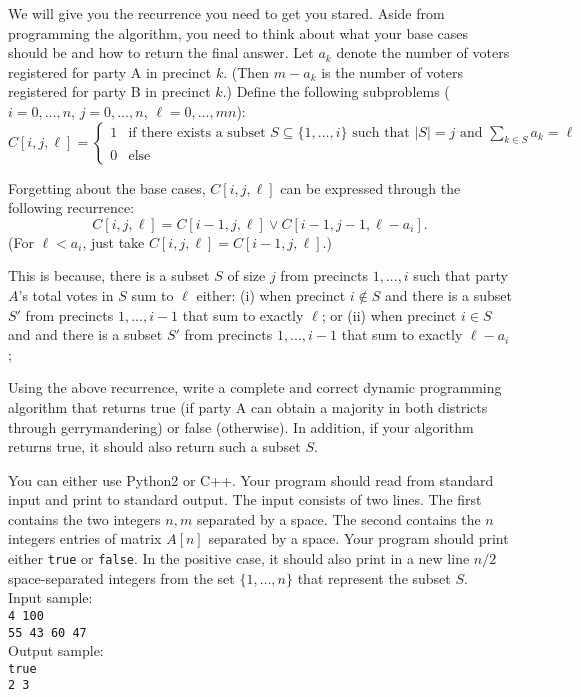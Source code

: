 \documentclass[11pt]{article}
\begin{document}
\begin{enumerate}
We will give you the recurrence you need to get you stared. Aside from programming the algorithm, you need to think about what your base cases should be and how to return the final answer. Let $a_k$ denote the number of voters registered for party A in precinct $k$.  (Then $m-a_k$ is the number of voters registered for party B in precinct $k$.)
Define the following subproblems ($i=0,\ldots,n$, $j=0,\ldots,n$, $\ell=0,\ldots,mn$):
\[ C[i,j,\ell] = \left\{\begin{array}{ll}
1 & \mbox{if there exists a subset $S\subseteq\{1,\dots,i\}$ such that $|S|=j$ and $\sum_{k\in S}a_k=\ell$}\\
0 & \mbox{else}
\end{array}\right.
\]

Forgetting about the base cases, $C[i, j, \ell]$ can be expressed through the following recurrence:
$$C[i,j,\ell] = C[i-1,j,\ell] \vee C[i-1,j-1,\ell-a_i].$$
(For $\ell<a_i$, just take $C[i,j,\ell]=C[i-1,j,\ell]$.)

This is because, there is a subset $S$ of size $j$ from precincts $1,...,i$ such that party $A$'s total votes in $S$ sum to $\ell$ either: (i) when precinct $i \not \in S$ and there is a subset $S'$ from precincts $1,...,i-1$ that sum to exactly $\ell$; or (ii) when precinct $i \in S$ and and there is a subset $S'$ from precincts $1,...,i-1$ that sum to exactly $\ell - a_i$; 

Using the above recurrence, write a complete and correct dynamic programming algorithm that returns true (if party A can obtain a majority in both districts through gerrymandering) or false (otherwise). In addition, if your algorithm returns true, it should also return such a subset $S$.

You can either use Python2 or C++. Your program should read from standard input and print to standard output. The input consists of two lines. The first contains the two integers $n,m$ separated by a space. The second contains the $n$ integers entries of matrix $A[n]$ separated by a space. Your program should print either {\tt true} or {\tt false}. In the positive case, it should also print in a new line $n/2$ space-separated integers from the set $\{1,\ldots,n\}$ that represent the subset $S$.\\
Input sample:\\
{\tt 4 100}\\
{\tt 55 43 60 47}\\
Output sample:\\
{\tt true}\\
{\tt 2 3}



\end{enumerate}
\end{document}
